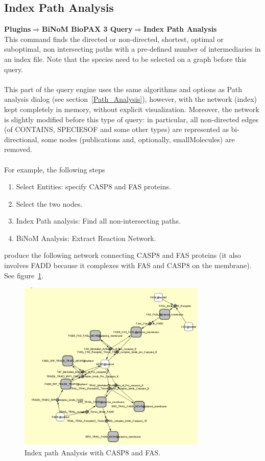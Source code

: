 \parbox{\textwidth}{
\subsection{Index Path Analysis}
\textbf{Plugins$\Rightarrow$BiNoM BioPAX 3 Query$\Rightarrow$Index Path Analysis}\\
This command finds the directed or non-directed, shortest, optimal or suboptimal, non intersecting paths with a pre-defined number of intermediaries in an index file. Note that the species need to be selected on a graph before this query.\\\\
This part of the query engine uses the same algorithms and options as Path analysis dialog (see section~\ref{Path_Analysis}), however, with the network (index) kept completely in memory, without explicit visualization. Moreover, the network is slightly modified before this type of query: in particular, all non-directed edges (of CONTAINS, SPECIESOF and some other types) are represented as bi-directional, some nodes (publications and, optionally, smallMolecules) are removed.\\\\
For example, the following steps
\begin{enumerate}
\item Select Entities: specify CASP8 and FAS proteins.
\item Select the two nodes.
\item Index Path analysis: Find all non-intersecting paths.
\item BiNoM Analysis: Extract Reaction Network.
\end{enumerate}
produce the following network connecting CASP8 and FAS proteins (it also involves FADD because it complexes with FAS and CASP8 on the membrane). See figure~\ref{Index_Path_Analysis}.
}
\begin{figure}[h]
\centering
\includegraphics[width=0.8\textwidth]{graphics/Index_Path_Analysis}
\caption{Index path Analysis with CASP8 and FAS.}
\label{Index_Path_Analysis}
\end{figure}

